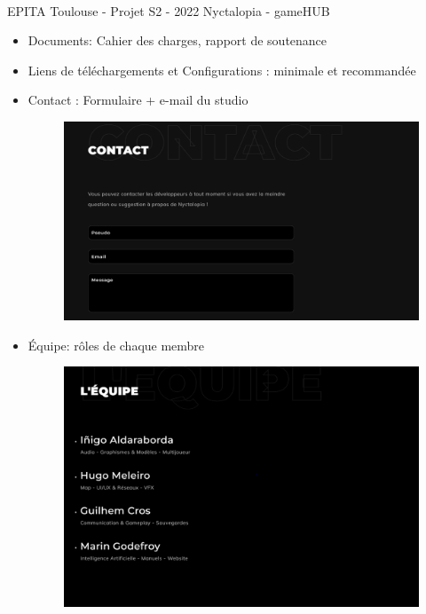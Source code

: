 \vfill
\noindent\makebox[\linewidth]{\rule{.8\paperwidth}{.6pt}}\\[0.2cm]
EPITA Toulouse - Projet S2 - 2022 \hfill Nyctalopia - gameHUB
\noindent\makebox[\linewidth]{\rule{.8\paperwidth}{.6pt}}
\newpage

\begin{itemize}

    \item Documents: Cahier des charges, rapport de soutenance

    \item Liens de téléchargements et Configurations : minimale et recommandée 

    \item Contact : Formulaire + e-mail du studio
    
\begin{figure}[H]
\centering
\begin{minipage}{.5\textwidth}
  \centering
  \centerline{\includegraphics[width=1\linewidth]{img/contact.png}}
  \label{fig:contact}
\end{minipage}%
\end{figure}


    \item Équipe: rôles de chaque membre 

\begin{figure}[H]
\centering
\begin{minipage}{.5\textwidth}
  \centering
  \centerline{\includegraphics[width=1\linewidth]{img/team.png}}
  \label{fig:team}
\end{minipage}%
\end{figure}
    


\end{itemize}
